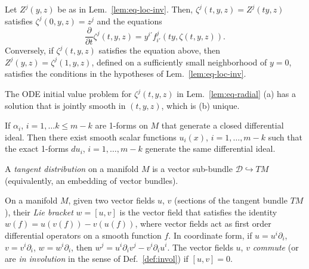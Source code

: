 \begin{lemma} \label{lem:eq-radial}
Let $Z^j(y,z)$ be as in Lem.~\ref{lem:eq-loc-inv}. Then, $\zeta^j(t,y,z) =
Z^j(ty,z)$ satisfies $\zeta^j(0,y,z) = z^j$ and the equations
\[
  \frac{\partial}{\partial t} \zeta^j(t,y,z) = y^{i'} f_{i'}^j(ty,\zeta(t,y,z)) .
\]
Conversely, if $\zeta^j(t,y,z)$ satisfies the equation above, then $Z^j(y,z) =
\zeta^j(1,y,z)$, defined on a sufficiently small neighborhood of $y=0$,
satisfies the conditions in the hypotheses of Lem.~\ref{lem:eq-loc-inv}.
\end{lemma}

\begin{lemma} \label{lem:eq-radial-exists}
The ODE initial value problem for $\zeta^j(t,y,z)$ in Lem.~\ref{lem:eq-radial}
(a) has a solution that is jointly smooth in $(t,y,z)$, which is (b) unique.
\end{lemma}

\begin{definition} \label{def:forms}
\notready
\end{definition}

\begin{definition} \label{def:diff-ideal}
\notready
\end{definition}

\begin{theorem} \label{thm:frob-forms}
If $\alpha_i$, $i=1,\ldots k\le m-k$ are 1-forms on $M$ that generate a closed
differential ideal. Then there exist smooth scalar functions $u_i(x)$,
$i=1,\ldots,m-k$ such that the exact 1-forms $du_i$, $i=1,\ldots,m-k$ generate
the same differential ideal.
\end{theorem}

\begin{definition} \label{def:vec-dist}
A \emph{tangent distribution} on a manifold $M$ is a vector sub-bundle
$\mathcal{D}\hookrightarrow TM$ (equivalently, an embedding of vector bundles).
\end{definition}

\begin{definition} \label{def:lie}
On a manifold $M$, given two vector fields $u$, $v$ (sections of the tangent
bundle $TM$), their \emph{Lie bracket} $w = [u,v]$ is the vector field that
satisfies the identity $w(f) = u(v(f)) - v(u(f))$, where vector fields act as
first order differential operators on a smooth function $f$. In coordinate form,
if $u = u^i\partial_i$, $v = v^i\partial_i$, $w = w^i\partial_i$, then $w^j =
u^i \partial_i v^j - v^i \partial_i u^i$. The vector fields $u$, $v$
\emph{commute} (or are \emph{in involution} in the sense of
Def.~\ref{def:invol}) if $[u,v] = 0$.
\end{definition}

